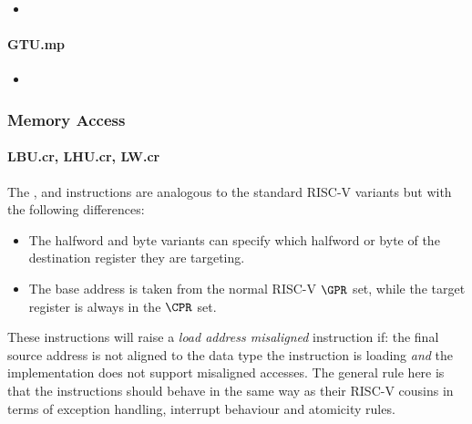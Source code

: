 \begin{itemize}
\item {}
\end{itemize}

\paragraph{GTU.mp}

\begin{itemize}
\item {}
\end{itemize}

\subsubsection{Memory Access}

\paragraph{LBU.cr, LHU.cr, LW.cr}

The ,  and  instructions are analogous to
the standard RISC-V variants but with the following differences:

\begin{itemize}
\item The halfword and byte variants can specify which halfword or byte of
      the destination register they are targeting.
\item The base address is taken from the normal RISC-V $\GPR$ set, while the
      target register is always in the $\CPR$ set.
\end{itemize}

These instructions will raise a {\em load address misaligned} instruction
if: the final source address is not aligned to the data type the instruction
is loading {\em and} the implementation does not support misaligned accesses.
The general rule here is that the  instructions should behave in
the same way as their RISC-V cousins in terms of exception handling,
interrupt behaviour and atomicity rules.

